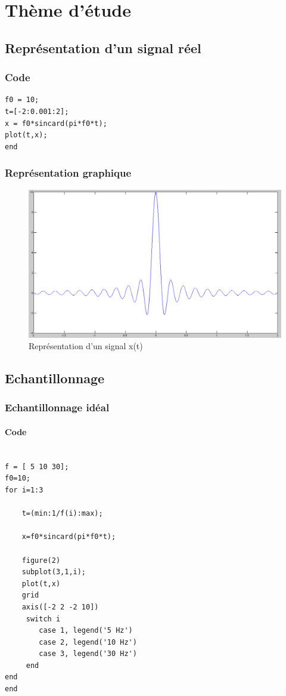 \documentclass[a4paper, oneside]{report}
\begin{document}
\newpage{}
\chapter{Th\`eme d'\'etude}
 \section{Repr\'esentation d'un signal r\'eel}
 	\subsection{Code}
	
  \begin{lstlisting}
f0 = 10;
t=[-2:0.001:2];
x = f0*sincard(pi*f0*t);
plot(t,x);
end
\end{lstlisting}  
  
 	\subsection{Repr\'esentation graphique}

\begin{figure}[h]
   \centering
    \includegraphics[scale=0.40]{images/exo1.png}
    \caption{Repr\'esentation d'un signal x(t)}
  \end{figure}
  
  \newpage{}
  \section{Echantillonnage}
  \subsection{Echantillonnage id\'eal}
    \subsubsection{Code}
	 \begin{lstlisting}

f = [ 5 10 30];
f0=10;
for i=1:3

    t=(min:1/f(i):max);

    x=f0*sincard(pi*f0*t);

    figure(2)
    subplot(3,1,i);
    plot(t,x)
    grid
    axis([-2 2 -2 10])
     switch i                                
        case 1, legend('5 Hz')       
        case 2, legend('10 Hz')    
        case 3, legend('30 Hz')
     end
end
end
\end{lstlisting}  
	
\end{document}
